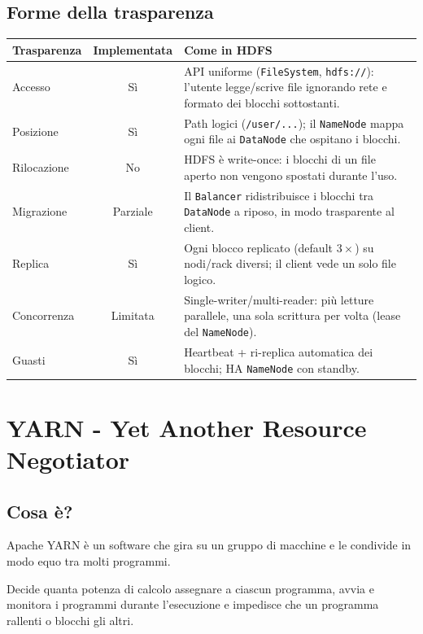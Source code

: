 \subsection{Forme della trasparenza}
\begin{table}[htbp]
\centering
\begin{tabularx}{\textwidth}{l c X}
\toprule
\textbf{Trasparenza} & \textbf{Implementata} & \textbf{Come in HDFS} \\
\midrule
Accesso & Sì & API uniforme (\texttt{FileSystem}, \texttt{hdfs://}): l'utente legge/scrive file ignorando rete e formato dei blocchi sottostanti. \\
\addlinespace
Posizione & Sì & Path logici (\texttt{/user/...}); il \texttt{NameNode} mappa ogni file ai \texttt{DataNode} che ospitano i blocchi. \\
\addlinespace
Rilocazione & No & HDFS è write-once: i blocchi di un file aperto non vengono spostati durante l'uso. \\
\addlinespace
Migrazione & Parziale & Il \texttt{Balancer} ridistribuisce i blocchi tra \texttt{DataNode} a riposo, in modo trasparente al client. \\
\addlinespace
Replica & Sì & Ogni blocco replicato (default $3\times$) su nodi/rack diversi; il client vede un solo file logico. \\
\addlinespace
Concorrenza & Limitata & Single-writer/multi-reader: più letture parallele, una sola scrittura per volta (lease del \texttt{NameNode}). \\
\addlinespace
Guasti & Sì & Heartbeat + ri-replica automatica dei blocchi; HA \texttt{NameNode} con standby. \\
\bottomrule
\end{tabularx}
\end{table}

\newpage
\section{YARN - Yet Another Resource Negotiator}
\subsection{Cosa è?}
Apache YARN è un software che gira su un gruppo di macchine e le condivide in modo equo tra molti programmi.

Decide quanta potenza di calcolo assegnare a ciascun programma, avvia e monitora i programmi durante l'esecuzione e impedisce che un programma rallenti o blocchi gli altri.

